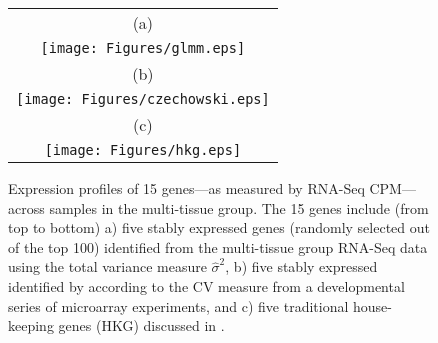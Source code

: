 	\begin{figure}[htbp]
		\begin{center}
			\begin{tabular}{c}
				(a)\\
				\texttt{[image: Figures/glmm.eps]} \\
				(b) \\
				\texttt{[image: Figures/czechowski.eps]} \\
				(c) \\
				\texttt{[image: Figures/hkg.eps]}
			\end{tabular}
			
			\caption[Expression profiles of 15 genes as measured by RNA-Seq CPM]{Expression 
			profiles of 15 genes---as measured by RNA-Seq CPM---across 
			\howmanytissuesample
				samples in the multi-tissue group. The 15 genes include (from top to
				bottom) a) five stably expressed genes (randomly selected out of the top 100)
				identified from the multi-tissue group RNA-Seq data using the total variance 
				measure $\hat{\sigma}^2$, b) five stably
				expressed identified by \citet{czechowski2005genome} according to the CV measure 
				from a
				developmental series of microarray experiments, and c) five
				traditional house-keeping genes (HKG) discussed in
				\citet{czechowski2005genome}. 
			}
			\label{expressionlevel1}
		\end{center}
	\end{figure} 
	
